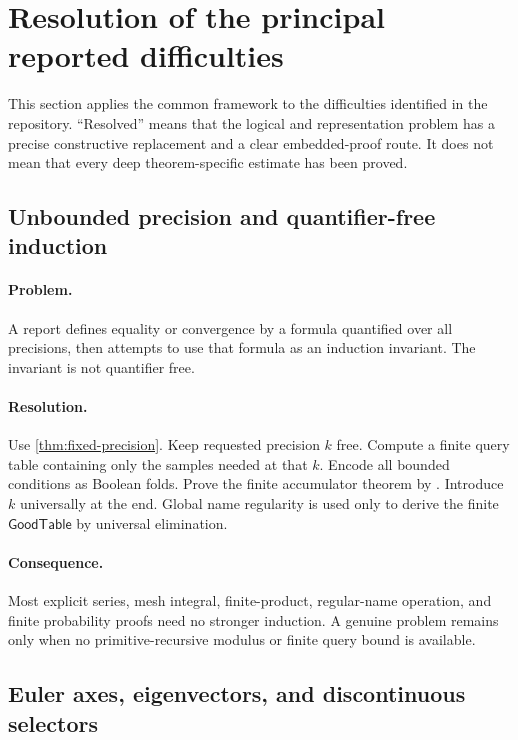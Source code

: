 \section{Resolution of the principal reported difficulties}
\label{sec:resolutions}

This section applies the common framework to the difficulties identified in
the repository.  ``Resolved'' means that the logical and representation
problem has a precise constructive replacement and a clear embedded-proof
route.  It does not mean that every deep theorem-specific estimate has been
proved.

\subsection{Unbounded precision and quantifier-free induction}

\paragraph{Problem.}
A report defines equality or convergence by a formula quantified over all
precisions, then attempts to use that formula as an induction invariant.  The
invariant is not quantifier free.

\paragraph{Resolution.}
Use \cref{thm:fixed-precision}.  Keep requested precision \(k\) free.  Compute
a finite query table containing only the samples needed at that \(k\).  Encode
all bounded conditions as Boolean folds.  Prove the finite accumulator theorem
by .  Introduce \(k\) universally at the end.  Global name
regularity is used only to derive the finite \(\mathsf{GoodTable}\) by
universal elimination.

\paragraph{Consequence.}
Most explicit series, mesh integral, finite-product, regular-name operation,
and finite probability proofs need no stronger induction.  A genuine problem
remains only when no primitive-recursive modulus or finite query bound is
available.

\subsection{Euler axes, eigenvectors, and discontinuous selectors}

